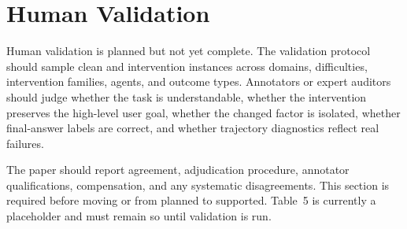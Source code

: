\section{Human Validation}

Human validation is planned but not yet complete. The validation protocol should sample clean and intervention instances across domains, difficulties, intervention families, agents, and outcome types. Annotators or expert auditors should judge whether the task is understandable, whether the intervention preserves the high-level user goal, whether the changed factor is isolated, whether final-answer labels are correct, and whether trajectory diagnostics reflect real failures.

The paper should report agreement, adjudication procedure, annotator qualifications, compensation, and any systematic disagreements. This section is required before moving  or  from planned to supported. Table~5 is currently a placeholder and must remain so until validation is run.
